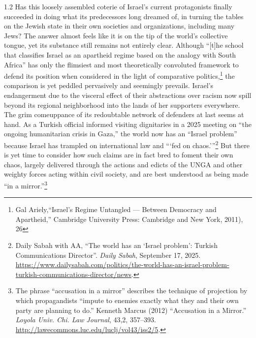 \documentclass[../unravbook.tex]{subfiles}
\begin{document}
\begin{spacing}{1.2}
Has this loosely assembled coterie of Israel's current protagonists finally succeeded in doing what its predecessors long dreamed of, in turning the tables on the Jewish state in their own societies and organizations, including many Jews? The answer almost feels like it is on the tip of the world's collective tongue, yet its substance still remains not entirely clear. Although \enquote{[t]he school that classifies Israel as an apartheid regime based on the analogy with South Africa} has only the flimsiest and most theoretically convoluted framework to defend its position when considered in the light of comparative politics,\footnote{Gal Ariely,\enquote{Israel's Regime Untangled --- Between Democracy and Apartheid,} Cambridge University Press: Cambridge and New York, 2011), 26} the comparison is yet peddled pervasively and seemingly prevails. Israel's endangerment due to the visceral effect of their abstractions over racism now spill beyond its regional neighborhood into the lands of her supporters everywhere. The grim comeuppance of its redoubtable network of defenders at last seems at hand. As a Turkish official informed visiting dignitaries in a 2025 meeting on ``the ongoing humanitarian crisis in Gaza,'' the world now has an \enquote{Israel problem} because Israel has trampled on international law and \enquote{\enquote*{fed on chaos.}}\footnote{  Daily Sabah with AA, \enquote{The world has an `Israel problem': Turkish Communications Director}. \textit{Daily Sabah}, September 17, 2025. \url{https://www.dailysabah.com/politics/the-world-has-an-israel-problem-turkish-communications-director/news}.} But there is yet time to consider how such claims are in fact bred to foment their own chaos, largely delivered through the actions and edicts of the UNGA and other weighty forces acting within civil society, and are best understood as being made ``in a mirror.''\footnote{The phrase ``accusation in a mirror'' describes the technique of projection by which propagandists ``impute to enemies exactly what they and their own party are planning to do.'' Kenneth Marcus (2012) ``Accusation in a Mirror.'' \textit{Loyola Univ. Chi. Law Journal}, 43,2, 357--393. \url{http://lawecommons.luc.edu/luclj/vol43/iss2/5}.}

\parindent 0pt
\parskip 6pt

\end{spacing}

{\footnotesize
\printendnotes[paragraph]}

\thispagestyle{empty} %
\end{document}
